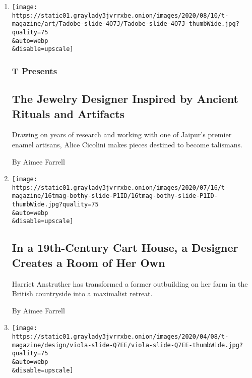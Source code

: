 \begin{enumerate}
\def\labelenumi{\arabic{enumi}.}
\item
  \href{/2020/08/10/t-magazine/alice-cicolini-jewelry-art.html}{}

  \texttt{[image: https://static01.graylady3jvrrxbe.onion/images/2020/08/10/t-magazine/art/Tadobe-slide-4O7J/Tadobe-slide-4O7J-thumbWide.jpg?quality=75\\\&auto=webp\\\&disable=upscale]}

  \hypertarget{t-presents}{%
  \subsubsection{T Presents}\label{t-presents}}

  \hypertarget{the-jewelry-designer-inspired-by-ancient-rituals-and-artifacts}{%
  \subsection{The Jewelry Designer Inspired by Ancient Rituals and
  Artifacts}\label{the-jewelry-designer-inspired-by-ancient-rituals-and-artifacts}}

  Drawing on years of research and working with one of Jaipur's premier
  enamel artisans, Alice Cicolini makes pieces destined to become
  talismans.

  By Aimee Farrell
\item
  \href{/2020/07/31/t-magazine/design-bothy-anstruther.html}{}

  \texttt{[image: https://static01.graylady3jvrrxbe.onion/images/2020/07/16/t-magazine/16tmag-bothy-slide-P1ID/16tmag-bothy-slide-P1ID-thumbWide.jpg?quality=75\\\&auto=webp\\\&disable=upscale]}

  \hypertarget{in-a-19th-century-cart-house-a-designer-creates-a-room-of-her-own}{%
  \subsection{In a 19th-Century Cart House, a Designer Creates a Room of
  Her
  Own}\label{in-a-19th-century-cart-house-a-designer-creates-a-room-of-her-own}}

  Harriet Anstruther has transformed a former outbuilding on her farm in
  the British countryside into a maximalist retreat.

  By Aimee Farrell
\item
  \href{/2020/04/09/t-magazine/viola-lanari.html}{}

  \texttt{[image: https://static01.graylady3jvrrxbe.onion/images/2020/04/08/t-magazine/design/viola-slide-Q7EE/viola-slide-Q7EE-thumbWide.jpg?quality=75\\\&auto=webp\\\&disable=upscale]}


\end{enumerate}
